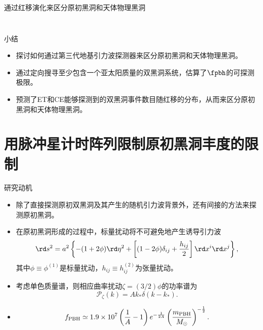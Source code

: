 \documentclass[xcolor={svgnames},compress]{beamer}
\let\olditem\item
\renewcommand{\item}{%
    \olditem\vspace{\fill}}
\def\({\left(}
\def\){\right)}
\def\({\left(}
\def\){\right)}
\def\e{\begin{equation}}
\def\q{\end{equation}}
\begin{document}
\begin{frame}{通过红移演化来区分原初黑洞和天体物理黑洞}
\begin{columns}
\begin{column}{0.55\textwidth}
\begin{figure}[htbp!]
            \end{figure}
        \end{column}
    \end{columns}
\centering
{}
\end{frame}
\begin{frame}{小结}	
    \begin{itemize}        
        \item 探讨如何通过第三代地基引力波探测器来区分原初黑洞和天体物理黑洞。
        \item 通过定向搜寻至少包含一个亚太阳质量的双黑洞系统，估算了$\fpbh$的可探测极限。
        \item 预测了ET和CE能够探测到的双黑洞事件数目随红移的分布，从而来区分原初黑洞和天体物理黑洞。
    \end{itemize}
\end{frame}

\section[PTA限制$\fpbh$]{用脉冲星计时阵列限制原初黑洞丰度的限制}

\begin{frame}{研究动机}
    \begin{itemize}
        \item 除了直接探测原初双黑洞及其产生的随机引力波背景外，还有间接的方法来探测原初黑洞。
        \item 在原初黑洞形成的过程中，标量扰动将不可避免地产生诱导引力波
        {\small
        \e
        \rd s^{2}=a^{2}\left\{-(1+2 \phi) \rd \eta^{2}+\left[(1-2 \phi) \delta_{i j}+\frac{h_{i j}}{2}\right] \rd x^{i} \rd x^{j}\right\},
        \q
    }
        其中$\phi \equiv \phi^{(1)}$是标量扰动，$h_{ij} \equiv h_{ij}^{(2)}$为张量扰动。
        
        \item 考虑单色质量谱，则相应曲率扰动$\zeta= (3/2)\phi$的功率谱为
        \e\label{pzeta1}
        \mathcal{P}_{\zeta}(k)=A k_*\delta\(k-k_*\).
        \q
        
        \item {}
        {\small
        \e\label{fpbh}
        f_{\mathrm{PBH}} \simeq 1.9 \times 10^{7}
        \(\frac{1}{A}-1\) e^{-{1\over 2A}} \left(\frac{m_{\mathrm{PBH}}}{M_{\odot}}\right)^{-\frac{1}{2}}.
        \q
    }
    \end{itemize}
\end{frame}
\end{document}
